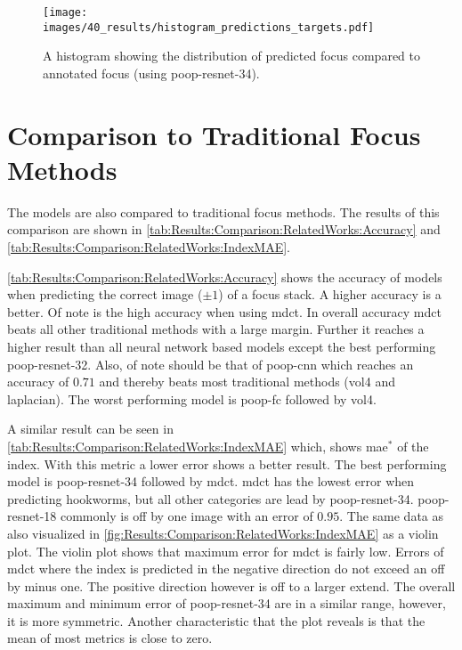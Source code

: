 \begin{figure}
    \centering
    \texttt{[image: images/40\_results/histogram\_predictions\_targets.pdf]}
    \caption{A histogram showing the distribution of predicted focus compared to annotated focus (using \acs{poop}-\acs{resnet}-34).}
    \label{fig:Results:HistogramPredictedTarget}
\end{figure}


\FloatBarrier

\section{Comparison to Traditional Focus Methods}
\label{sec:Results:TraditionalFocusMethods}

The models are also compared to traditional focus methods. The results of this comparison are shown in \autoref{tab:Results:Comparison:RelatedWorks:Accuracy} and \autoref{tab:Results:Comparison:RelatedWorks:IndexMAE}.

\autoref{tab:Results:Comparison:RelatedWorks:Accuracy} shows the accuracy of models when predicting the correct image ($\pm 1$) of a focus stack. A higher accuracy is a better. Of note is the high accuracy when using \ac{mdct}. In overall accuracy \ac{mdct} beats all other traditional methods with a large margin. Further it reaches a higher result than all neural network based models except the best performing \acs{poop}-\acs{resnet}-32. Also, of note should be that of \acs{poop}-\acs{cnn} which reaches an accuracy of $0.71$ and thereby beats most traditional methods (\ac{vol4} and \ac{laplacian}). The worst performing model is \acs{poop}-\acs{fc} followed by \ac{vol4}.

A similar result can be seen in \autoref{tab:Results:Comparison:RelatedWorks:IndexMAE} which, shows \ac{mae}$^*$ of the index. With this metric a lower error shows a better result. The best performing model is \acs{poop}-\acs{resnet}-34 followed by \acs{mdct}. \Acs{mdct} has the lowest error when predicting hookworms, but all other categories are lead by \acs{poop}-\acs{resnet}-34. \Acs{poop}-\acs{resnet}-18 commonly is off by one image with an error of $0.95$. The same data as also visualized in \autoref{fig:Results:Comparison:RelatedWorks:IndexMAE} as a violin plot. The violin plot shows that maximum error for \ac{mdct} is fairly low. Errors of \ac{mdct} where the index is predicted in the negative direction do not exceed an off by minus one. The positive direction however is off to a larger extend. The overall maximum and minimum error of \acs{poop}-\acs{resnet}-34 are in a similar range, however, it is more symmetric. Another characteristic that the plot reveals is that the mean of most metrics is close to zero.


